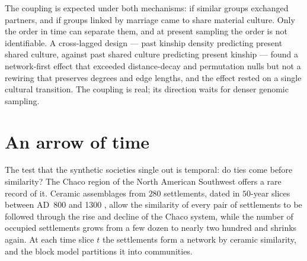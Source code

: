 The coupling is expected under both mechanisms: if similar groups exchanged partners, and
if groups linked by marriage came to share material culture. Only the order in time can
separate them, and at present sampling the order is not identifiable. A cross-lagged
design --- past kinship density predicting present shared culture, against past shared
culture predicting present kinship --- found a network-first effect that exceeded
distance-decay and permutation nulls but not a rewiring that preserves degrees and edge
lengths, and the effect rested on a single cultural transition. The coupling is real; its
direction waits for denser genomic sampling.

\section{An arrow of time}

The test that the synthetic societies single out is temporal: do ties come before
similarity? The Chaco region of the North American Southwest offers a rare record of it.
Ceramic assemblages from $280$ settlements, dated in $50$-year slices between AD~800 and
1300 \citep{mills2018,daems2023}, allow the similarity of every pair of settlements to be
followed through the rise and decline of the Chaco system, while the number of occupied
settlements grows from a few dozen to nearly two hundred and shrinks again. At each time
slice $t$ the settlements form a network by ceramic similarity, and the block model
partitions it into communities.

